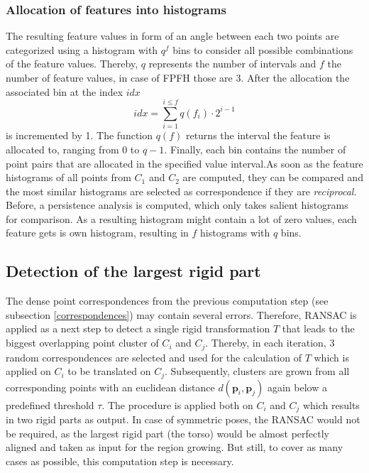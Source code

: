 \subsubsection{Allocation of features into histograms}
The resulting feature values in form of an angle between each two points are categorized using a histogram with $q^f$ bins to consider all possible combinations of the feature values. Thereby, $q$ represents the number of intervals and $f$ the number of feature values, in case of FPFH those are 3. After the allocation the associated bin at the index $idx$
\begin{equation}
idx = \displaystyle\sum_{i=1}^{i \leq f}q(f_i) \cdot 2^{i-1}
\end{equation}
is incremented by 1. The function $q(f)$ returns the interval the feature is allocated to, ranging from 0 to $q - 1$. Finally, each bin contains the number of point pairs that are allocated in the specified value interval.As soon as the feature histograms of all points from $C_1$ and $C_2$ are computed, they can be compared and the most similar histograms are selected as correspondence if they are \textit{reciprocal}. Before, a persistence analysis is computed, which only takes salient histograms for comparison. As a resulting histogram might contain a lot of zero values, each feature gets is own histogram, resulting in $f$ histograms with $q$ bins.


\subsection{Detection of the largest rigid part}
\label{detectionLRP}
The dense point correspondences from the previous computation step (see subsection \ref{correspondences}) may contain several errors. Therefore, RANSAC is applied as a next step to detect a single rigid transformation $T$ that leads to the biggest overlapping point cluster of $C_i$ and $C_j$. Thereby, in each iteration, 3 random correspondences are selected and used for the calculation of $T$ which is applied on $C_i$ to be translated on $C_j$. Subsequently, clusters are grown from all corresponding points with an euclidean distance $d(\boldsymbol{p}_i,\boldsymbol{p}_j)$ again below a predefined threshold $\tau$. The procedure is applied both on $C_i$ and $C_j$ which results in two rigid parts as output. In case of symmetric poses, the RANSAC would not be required, as the largest rigid part (the torso) would be almost perfectly aligned and taken as input for the region growing. But still, to cover as many cases as possible, this computation step is necessary. 

